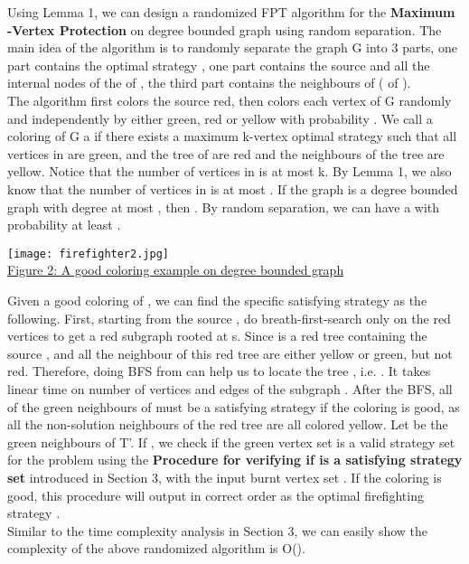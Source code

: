 \documentclass[11pt,letter]{article}
\begin{document}
Using Lemma 1, we can design a randomized FPT algorithm for the \textbf{Maximum -Vertex Protection} on degree bounded graph using random separation. The main idea of the algorithm is to randomly separate the graph G into 3 parts, one part contains the optimal strategy , one part contains the source  and all the internal nodes of the  of , the third part contains the neighbours of ( of ). \\

The algorithm first colors the source  red, then colors each vertex of G randomly and independently by either green, red or yellow with probability . We call a coloring of G a  if there exists a maximum k-vertex optimal strategy  such that all vertices in  are green, and the tree  of  are red and the neighbours of the tree  are yellow. Notice that the number of vertices in  is at most k. By Lemma 1, we also know that the number of vertices in  is at most . If the graph  is a degree bounded graph with degree at most , then . By random separation, we can have a  with probability at least . \\

\begin{center}
\texttt{[image: firefighter2.jpg]}\\
\underline{Figure 2: A good coloring example on degree bounded graph}
\end{center}

Given a good coloring of , we can find the specific satisfying strategy  as the following. First, starting from the source , do breath-first-search only on the red vertices to get a red subgraph  rooted at s. Since  is a red tree containing the source , and all the neighbour of this red tree  are either yellow or green, but not red. Therefore, doing BFS from  can help us to locate the tree , i.e. . It takes linear time on number of vertices and edges of the subgraph . After the BFS, all of the green neighbours of  must be a satisfying strategy if the coloring is good, as all the non-solution neighbours of the red tree  are all colored yellow. Let  be the green neighbours of T'. If , we check if the green vertex set  is a valid strategy set for the problem using the {\bf  Procedure for verifying if  is a satisfying strategy set} introduced in Section 3, with the input burnt vertex set . If the coloring is good, this procedure will output  in correct order as the optimal firefighting strategy . \\

Similar to the time complexity analysis in Section 3, we can easily show the complexity of the above randomized algorithm is O().
\end{document}
